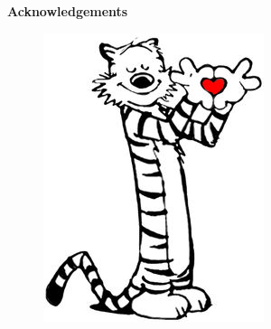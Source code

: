 \cleardoublepage\thispagestyle{empty}
\begin{center}
	\vspace*{10mm}
     
	\huge \textbf{Acknowledgements}

	\vspace{10mm}
\begin{figure}[th]
	\centering
	\includegraphics[width=0.5\linewidth]{./HobbesHeartsCalvin}
\end{figure}
\vspace{10mm}



\end{center}

\cleardoublepage
\setlength{\topmargin}{0mm}
\normalsize%